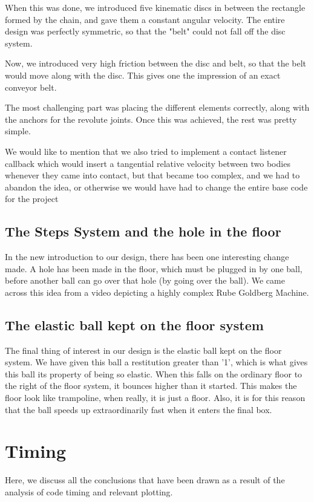 \documentclass[a4paper,11pt]{article}
\begin{document}
When this was done, we introduced five kinematic discs in between the rectangle formed by the chain, and gave them a constant angular velocity. The entire design was perfectly symmetric, so that the "belt" could not fall off the disc system.

Now, we introduced very high friction between the disc and belt, so that the belt would move along with the disc. This gives one the impression of an exact conveyor belt.

The most challenging part was placing the different elements correctly, along with the anchors for the revolute joints. Once this was achieved, the rest was pretty simple.

We would like to mention that we also tried to implement a contact listener callback which would insert a tangential relative velocity between two bodies whenever they came into contact, but that became too complex, and we had to abandon the idea, or otherwise we would have had to change the entire base code for the project

\subsection{The Steps System and the hole in the floor}

In the new introduction to our design, there has been one interesting change made. A hole has been made in the floor, which must be plugged in by one ball, before another ball can go over that hole (by going over the ball). We came across this idea from a video depicting a highly complex Rube Goldberg Machine.

\subsection{The elastic ball kept on the floor system}

The final thing of interest in our design is the elastic ball kept on the floor system. We have given this ball a restitution greater than '1', which is what gives this ball its property of being so elastic. When this falls on the ordinary floor to the right of the floor system, it bounces higher than it started. This makes the floor look like trampoline, when really, it is just a floor. Also, it is for this reason that the ball speeds up extraordinarily fast when it enters the final box. 
\pagebreak
	\section{Timing}
	Here, we discuss all the conclusions that have been drawn as a result of the analysis of code timing and relevant plotting.
\end{document}

